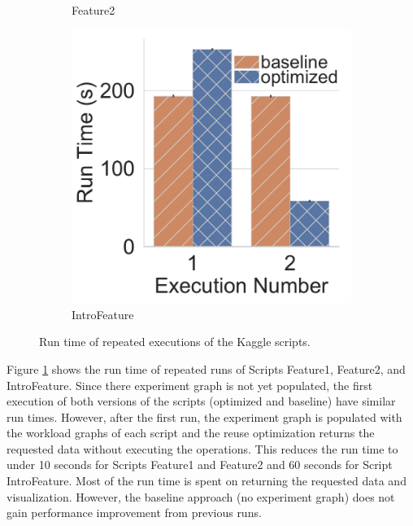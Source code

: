 \begin{figure}
\begin{subfigure}[b]{0.33\linewidth}
\caption{Feature2}
\end{subfigure}%
\begin{subfigure}[b]{0.33\linewidth}
\centering
\includegraphics[width=\linewidth]{../images/experiment-results/reuse/kaggle-repeated-workloads/start_here_a_gentle_introduction}
\caption{IntroFeature}
\end{subfigure}
\caption{Run time of repeated executions of the Kaggle scripts.}
\label{exp-reuse-kaggle-same-workload}
\end{figure}

Figure \ref{exp-reuse-kaggle-same-workload} shows the run time of repeated runs of Scripts Feature1,  Feature2, and IntroFeature.
Since there experiment graph is not yet populated, the first execution of both versions of the scripts (optimized and baseline) have similar run times.
However, after the first run, the experiment graph is populated with the workload graphs of each script and the reuse optimization returns the requested data without executing the operations.
This reduces the run time to under 10 seconds for Scripts Feature1 and Feature2 and 60 seconds for Script IntroFeature.
Most of the run time is spent on returning the requested data and visualization.
However, the baseline approach (no experiment graph) does not gain performance improvement from previous runs.

